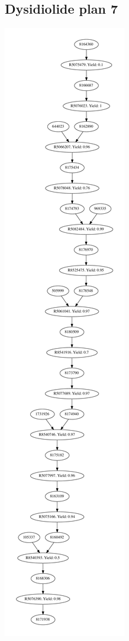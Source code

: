 \documentclass[a4paper,10pt,titlepage]{paper}
\begin{document}
\subsection{Dysidiolide plan 7}
\centering
\includegraphics[scale=0.4]{Synteseplaner/Dysidiolide/plan7.pdf}
\label{Appendix::Dysidiolide7}
\end{document}
